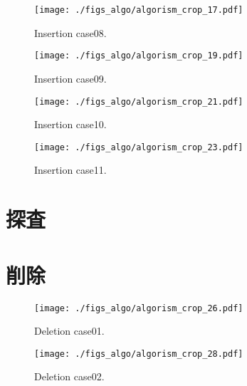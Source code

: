 \begin{figure}[h]
  \vspace{-0.5cm}
  \texttt{[image: ./figs\_algo/algorism\_crop\_17.pdf]}
  \caption{
    Insertion case08.
  }
  \label{fig_IpCHashT_insert_hard_case08}
  \vspace{-0.5cm}
\end{figure}

\begin{figure}[h]
  \vspace{-0.5cm}
  \texttt{[image: ./figs\_algo/algorism\_crop\_19.pdf]}
  \caption{
    Insertion case09.
  }
  \label{fig_IpCHashT_insert_hard_case09}
  \vspace{-0.5cm}
\end{figure}

\begin{figure}[h]
  \vspace{-0.5cm}
  \texttt{[image: ./figs\_algo/algorism\_crop\_21.pdf]}
  \caption{
    Insertion case10.
  }
  \label{fig_IpCHashT_insert_hard_case10}
  \vspace{-0.5cm}
\end{figure}

\begin{figure}[h]
  \vspace{-0.5cm}
  \texttt{[image: ./figs\_algo/algorism\_crop\_23.pdf]}
  \caption{
    Insertion case11.
  }
  \label{fig_IpCHashT_insert_hard_case11}
  \vspace{-0.5cm}
\end{figure}



\section{探査}


\section{削除}
\begin{figure}[h]
  \vspace{-0.5cm}
  \texttt{[image: ./figs\_algo/algorism\_crop\_26.pdf]}
  \caption{
    Deletion case01.
  }
  \label{fig_IpCHashT_deletion_case01}
  \vspace{-0.5cm}
\end{figure}

\begin{figure}[h]
  \vspace{-0.5cm}
  \texttt{[image: ./figs\_algo/algorism\_crop\_28.pdf]}
  \caption{
    Deletion case02.
  }
  \label{fig_IpCHashT_deletion_case02}
  \vspace{-0.5cm}
\end{figure}

